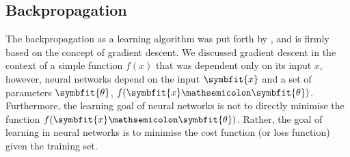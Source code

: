 \subsection{Backpropagation}\label{eqn:backprop}
The backpropagation as a learning algorithm was put forth by \textcite{rumelhart1986learning}, and is firmly based on the concept of gradient descent. We discussed gradient descent in the context of a simple function $f(x)$ that was dependent only on its input $x$, however, neural networks depend on the input $\symbfit{x}$ and a set of parameters $\symbfit{\theta}$, $f(\symbfit{x} \mathsemicolon \symbfit{\theta})$. Furthermore, the learning goal of neural networks is not to directly minimise the function $f(\symbfit{x} \mathsemicolon \symbfit{\theta})$. Rather, the goal of learning in neural networks is to minimise the cost function (or loss function) given the training set. 

